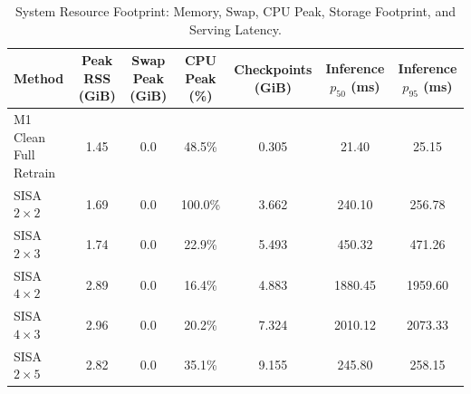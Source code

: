 \begin{table}[t]
\centering
\small
\caption{System Resource Footprint: Memory, Swap, CPU Peak, Storage Footprint, and Serving Latency.}
\label{tab:resources}
\begin{tabular}{lcccccc}
\toprule
\textbf{Method} & \textbf{Peak RSS (GiB)} & \textbf{Swap Peak (GiB)} & \textbf{CPU Peak (\%)} & \textbf{Checkpoints (GiB)} & \textbf{Inference $p_{50}$ (ms)} & \textbf{Inference $p_{95}$ (ms)} \\
\midrule
M1 Clean Full Retrain & 1.45 & 0.0 & 48.5\% & 0.305 & 21.40 & 25.15 \\
SISA $2\times2$ & 1.69 & 0.0 & 100.0\% & 3.662 & 240.10 & 256.78 \\
SISA $2\times3$ & 1.74 & 0.0 & 22.9\% & 5.493 & 450.32 & 471.26 \\
SISA $4\times2$ & 2.89 & 0.0 & 16.4\% & 4.883 & 1880.45 & 1959.60 \\
SISA $4\times3$ & 2.96 & 0.0 & 20.2\% & 7.324 & 2010.12 & 2073.33 \\
SISA $2\times5$ & 2.82 & 0.0 & 35.1\% & 9.155 & 245.80 & 258.15 \\
\bottomrule
\end{tabular}
\end{table}
